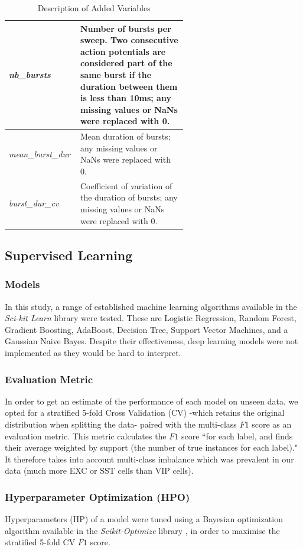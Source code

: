 \documentclass{IEEEtran}
\begin{document}
\begin{table}[h!]
\begin{tabular}{|l|p{0.6\linewidth}|}
  \hline
  \textit{nb\_bursts} & Number of bursts per sweep. Two consecutive action potentials are considered part of the same burst if the duration between them is less than 10ms; any missing values or NaNs were replaced with 0. \\
  \hline
  \textit{mean\_burst\_dur} & Mean duration of bursts; any missing values or NaNs were replaced with 0. \\
  \hline
  \textit{burst\_dur\_cv} & Coefficient of variation of the duration of bursts; any missing values or NaNs were replaced with 0. \\
  \hline
  \end{tabular}
  \caption{Description of Added Variables}
  \label{tab:variables}
\end{table}


\subsection{Supervised Learning}

\subsubsection{Models}
In this study, a range of established machine learning algorithms available in the \textit{Sci-kit Learn} library \cite{scikit-learn} were tested. These are Logistic Regression, Random Forest, Gradient Boosting, AdaBoost, Decision Tree, Support Vector Machines, and a Gaussian Naive Bayes.
Despite their effectiveness, deep learning models were not implemented as they would be hard to interpret.

\subsubsection{Evaluation Metric}
In order to get an estimate of the performance of each model on unseen data, we opted for a stratified 5-fold Cross Validation (CV) -which retains the original distribution when splitting the data- paired with the multi-class $F1$ score as an evaluation metric. This metric calculates the $F1$ score ``for each label, and finds their average weighted by support (the number of true instances for each label)." \cite{scikit-learn} It therefore takes into account multi-class imbalance which was prevalent in our data (much more EXC or SST cells than VIP cells).

\subsubsection{Hyperparameter Optimization (HPO)}
Hyperparameters (HP) of a model were tuned using a Bayesian optimization algorithm available in the \textit{Scikit-Optimize} library \cite{scikit-optimize}, in order to maximise the stratified 5-fold CV $F1$ score.
\end{document}
